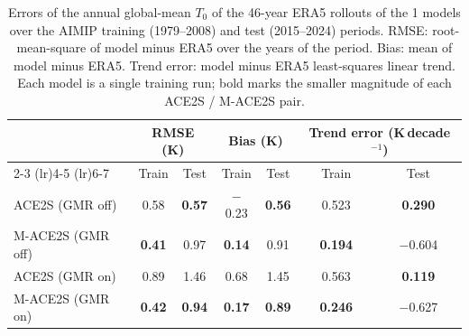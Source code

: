 \begin{table}[H]
  \caption{Errors of the annual global-mean $T_0$ of the 46-year ERA5 rollouts of the 1\textdegree{} models over the AIMIP training (1979--2008) and test (2015--2024) periods. RMSE: root-mean-square of model minus ERA5 over the years of the period. Bias: mean of model minus ERA5. Trend error: model minus ERA5 least-squares linear trend. Each model is a single training run; bold marks the smaller magnitude of each ACE2S / M-ACE2S pair.}
  \label{table:t0_trend_1deg}
  \centering
  \small
  \begin{tabular}{lcccccc}
    \toprule
     & \multicolumn{2}{c}{RMSE (K)} & \multicolumn{2}{c}{Bias (K)} & \multicolumn{2}{c}{Trend error (K\,decade$^{-1}$)} \\
    \cmidrule(lr){2-3} \cmidrule(lr){4-5} \cmidrule(lr){6-7}
     & Train & Test & Train & Test & Train & Test \\
    \midrule
    ACE2S (GMR off) & 0.58 & \textbf{0.57} & $-$0.23 & \textbf{0.56} & 0.523 & \textbf{0.290} \\
    M-ACE2S (GMR off) & \textbf{0.41} & 0.97 & \textbf{0.14} & 0.91 & \textbf{0.194} & $-$0.604 \\
    \midrule
    ACE2S (GMR on) & 0.89 & 1.46 & 0.68 & 1.45 & 0.563 & \textbf{0.119} \\
    M-ACE2S (GMR on) & \textbf{0.42} & \textbf{0.94} & \textbf{0.17} & \textbf{0.89} & \textbf{0.246} & $-$0.627 \\
    \bottomrule
  \end{tabular}
\end{table}
